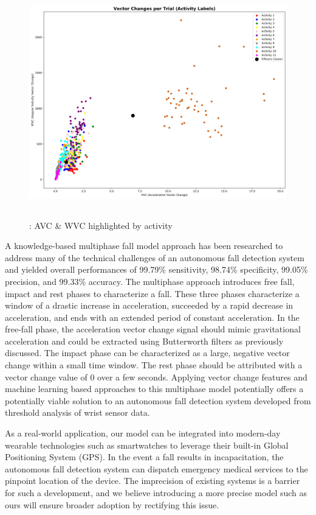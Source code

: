 \documentclass{llncs}
\begin{document}
\begin{figure} 
	\centering
	\includegraphics[width=12cm, height=10cm]{images/VC_11clusters.png} 
	\caption{: AVC \& WVC highlighted by activity}
	\label{Figure 6: K-Means Clusters of AVC and WVC Values per Trial}
\end{figure}
	
	A knowledge-based multiphase fall model approach has been researched to address many of the technical challenges of an autonomous fall detection system and yielded overall performances of 99.79\% sensitivity, 98.74\% specificity, 99.05\% precision, and 99.33\% accuracy.\cite{hsieh2017novel} The multiphase approach introduces free fall, impact and rest phases to characterize a fall. These three phases characterize a window of a drastic increase in acceleration, succeeded by a rapid decrease in acceleration, and ends with an extended period of constant acceleration. In the free-fall phase, the acceleration vector change signal should mimic gravitational acceleration and could be extracted using Butterworth filters as previously discussed. The impact phase can be characterized as a large, negative vector change within a small time window. The rest phase should be attributed with a vector change value of 0 over a few seconds. Applying vector change features and machine learning based approaches to this multiphase model potentially offers a potentially viable solution to an autonomous fall detection system developed from threshold analysis of wrist sensor data.

	As a real-world application, our model can be integrated into modern-day wearable technologies such as smartwatches to leverage their built-in Global Positioning System (GPS). In the event a fall results in incapacitation, the autonomous fall detection system can dispatch emergency medical services to the pinpoint location of the device. The imprecision of existing systems is a barrier for such a development, and we believe introducing a more precise model such as ours will ensure broader adoption by rectifying this issue.
\end{document}
